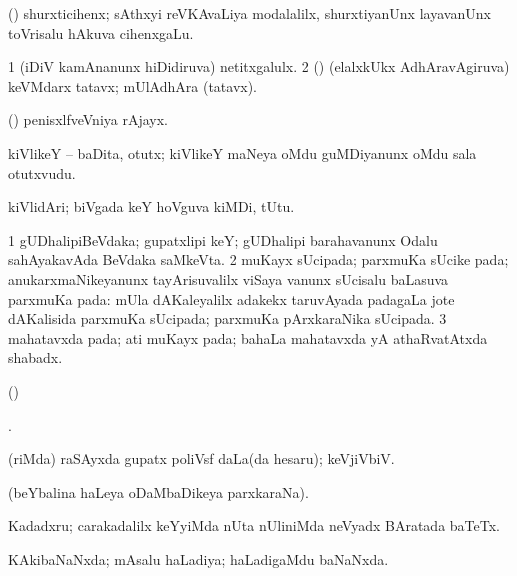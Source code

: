 \bentry
{}
\gl{\nA}
\bmng
(\saM) shurxticihenx; sAthxyi reVKAvaLiya modalalilx, shurxtiyanUnx layavanUnx toVrisalu hAkuva cihenxgaLu. 
\emng
\eentry

\bentry
{}
\gl{\nA}
\bmng
\bnum
\num{1} (iDiV kamAnanunx hiDidiruva) netitxgalulx.   
\num{2} (\rUpa) (elalxkUkx AdhAravAgiruva) keVMdarx tatavx; mUlAdhAra (tatavx). 
\enum
\emng
\eentry

\bentry
{}
\gl{\nA}
\bmng
(\ame) penisxlfveVniya rAjayx. 
\emng
\eentry

\bentry
{}
\gl{\nA}
\bmng
kiVlikeY -- baDita, otutx; kiVlikeY maNeya oMdu guMDiyanunx oMdu sala otutxvudu. 
\emng
\eentry

\bentry
{}
\gl{\nA}
\bmng
kiVlidAri; biVgada keY hoVguva kiMDi, tUtu. 
\emng
\eentry

\bentry
{}
\gl{\nA}
\bmng
\bnum
\num{1} gUDhalipiBeVdaka; gupatxlipi keY; gUDhalipi barahavanunx Odalu sahAyakavAda BeVdaka saMkeVta. 
\num{2} muKayx sUcipada; parxmuKa sUcike pada; anukarxmaNikeyanunx tayArisuvalilx viSaya \mo vanunx sUcisalu baLasuva parxmuKa pada:  mUla dAKaleyalilx adakekx taruvAyada padagaLa jote dAKalisida parxmuKa sUcipada; parxmuKa pArxkaraNika sUcipada. 
\num{3} mahatavxda pada; ati muKayx pada; bahaLa mahatavxda yA athaRvatAtxda shabadx. 
\enum
\emng
\eentry

\bentry
{}
\gl{\saMkiSx}
\bmng
(\birx)  
\emng
\eentry

\bentry
{}
\gl{\saMkiSx}
\bmng
{}. 
\emng
\eentry

\bentry
{}
\gl{\nA}
\bmng
(riMda) raSAyxda gupatx poliVsf daLa(da hesaru); keVjiVbiV. 
\emng
\eentry

\bentry
{}
\gl{\saMkiSx}
\bmng
{} (beYbalina haLeya oDaMbaDikeya  parxkaraNa). 
\emng
\eentry

\bentry
{}
\gl{\nA}
\bmng
Kadadxru; carakadalilx keYyiMda nUta nUliniMda neVyadx BAratada baTeTx. 
\emng
\eentry

\bentry
{}
\gl{\gu}
\bmng
KAkibaNaNxda; mAsalu haLadiya; haLadigaMdu baNaNxda. 
\emng
\eentry

